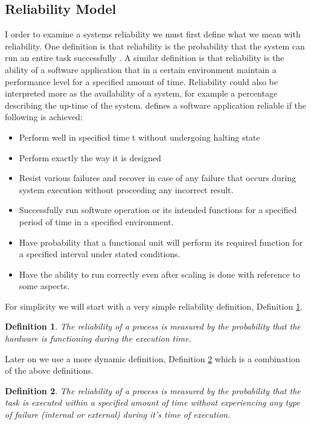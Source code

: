 \documentclass{cslthse-msc}
\newtheorem{definition}{Definition}[chapter]
\begin{document}
\subsection{Reliability Model} \label{subsec:definitions}
I order to examine a systems reliability we must first define what we mean with reliability. One definition is that reliability is the probability that the system can run an entire task successfully \cite{taskAllocation}. A similar definition is that reliability is the ability of a software application that in a certain environment  maintain a performance level for a specified amount of time. 
Reliability could also be interpreted more as the availability of a system, for example a percentage describing the up-time of the system. 
\cite{surveyReliabilityDistr} defines a software application reliable if the following is achieved:
\begin{itemize}
\item Perform well in specified time t without undergoing halting state
\item Perform exactly the way it is designed
\item Resist various failures and recover in case of any failure that occurs during system execution without proceeding any incorrect result.
\item Successfully run software operation or its intended functions for a specified period of time in a specified environment.
\item Have probability that a functional unit will perform its required function for a specified interval under stated conditions.
\item Have the ability to run correctly even after scaling is done with reference to some aspects.
\end{itemize}

For simplicity we will start with a very simple reliability definition, Definition \ref{def:simple_reliability}.
\begin{definition} \label{def:simple_reliability}
The reliability of a process is measured by the probability that the hardware is functioning during the execution time.
\end{definition}
Later on we use a more dynamic definition, Definition \ref{def:dyn_reliability} which is a combination of the above definitions. 

\begin{definition} \label{def:dyn_reliability}
The reliability of a process is measured by the probability that the task is executed within a specified amount of time without experiencing any type of failure (internal or external) during it's time of execution.
\end{definition}
\end{document}
